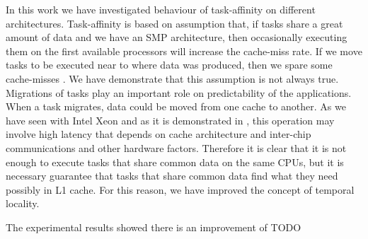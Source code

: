 In this work we have investigated behaviour of task-affinity on different architectures. Task-affinity is based on assumption that, if tasks share a great 
amount of data and we have an SMP architecture, then occasionally executing them on the first available processors will increase the cache-miss rate. If we 
move tasks to be executed near to where data was produced, then we spare some cache-misses \cite{lcs}. We have demonstrate that this assumption is not 
always true. Migrations of tasks play an important role on predictability of the applications. When a task migrates, data could be moved from one cache to 
another. As we have seen with Intel Xeon and as it is demonstrated in \cite{molka}, this operation may involve high latency that depends on cache 
architecture and inter-chip communications and other hardware factors. Therefore it is clear that it is not enough to execute tasks that share common data 
on the same CPUs, but it is necessary guarantee that tasks that share common data find what they need possibly in L1 cache. For this reason, we have 
improved the concept of temporal locality.

The experimental results showed there is an improvement of TODO 




%
%
%
%
%
%
%
%
%



%
%
%
%
%
%
%
%
%
%
%
%
%
%
